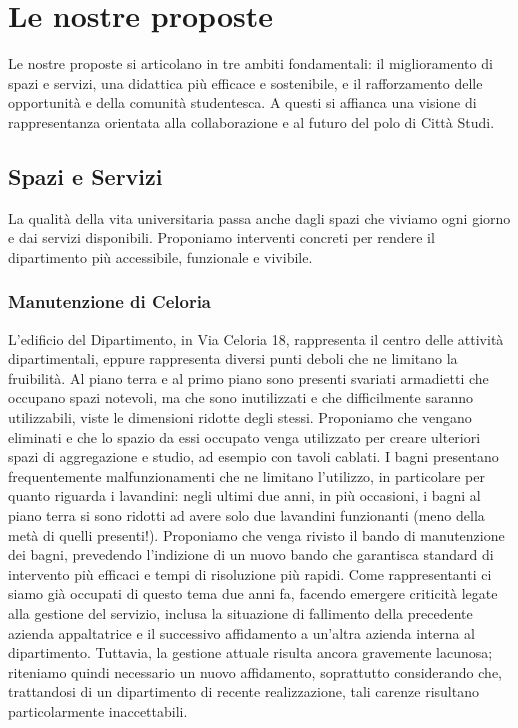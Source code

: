 \documentclass[12pt,a4paper]{article}
\begin{document}
\section{Le nostre proposte}
Le nostre proposte si articolano in tre ambiti fondamentali: il miglioramento di spazi e servizi, una didattica più efficace e sostenibile, e il rafforzamento delle opportunità e della comunità studentesca. A questi si affianca una visione di rappresentanza orientata alla collaborazione e al futuro del polo di Città Studi.

\subsection{Spazi e Servizi}

La qualità della vita universitaria passa anche dagli spazi che viviamo ogni giorno e dai servizi disponibili. Proponiamo interventi concreti per rendere il dipartimento più accessibile, funzionale e vivibile.

\subsubsection{Manutenzione di Celoria}
L'edificio del Dipartimento, in Via Celoria 18, rappresenta il centro delle attività dipartimentali, eppure rappresenta diversi punti deboli che ne limitano la fruibilità.
Al piano terra e al primo piano sono presenti svariati armadietti che occupano spazi notevoli, ma che sono inutilizzati e che difficilmente saranno utilizzabili, viste le dimensioni ridotte degli stessi. Proponiamo che vengano eliminati e che lo spazio da essi occupato venga utilizzato per creare ulteriori spazi di aggregazione e studio, ad esempio con tavoli cablati.
I bagni presentano frequentemente malfunzionamenti che ne limitano l'utilizzo, in particolare per quanto riguarda i lavandini: negli ultimi due anni, in più occasioni, i bagni al piano terra si sono ridotti ad avere solo due lavandini funzionanti (meno della metà di quelli presenti!).
Proponiamo che venga rivisto il bando di manutenzione dei bagni, prevedendo l’indizione di un nuovo bando che garantisca standard di intervento più efficaci e tempi di risoluzione più rapidi. Come rappresentanti ci siamo già occupati di questo tema due anni fa, facendo emergere criticità legate alla gestione del servizio, inclusa la situazione di fallimento della precedente azienda appaltatrice e il successivo affidamento a un’altra azienda interna al dipartimento. Tuttavia, la gestione attuale risulta ancora gravemente lacunosa; riteniamo quindi necessario un nuovo affidamento, soprattutto considerando che, trattandosi di un dipartimento di recente realizzazione, tali carenze risultano particolarmente inaccettabili.
\end{document}
